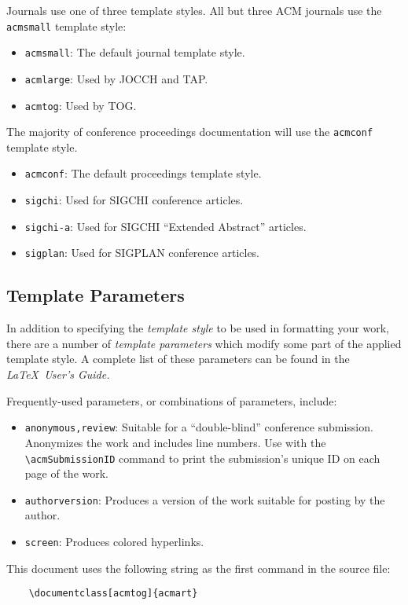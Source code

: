 \documentclass[acmtog]{acmart}
\begin{document}
	Journals use one of three template styles. All but three ACM journals
	use the {\verb|acmsmall|} template style:
	\begin{itemize}
		\item {\verb|acmsmall|}: The default journal template style.
		\item {\verb|acmlarge|}: Used by JOCCH and TAP.
		\item {\verb|acmtog|}: Used by TOG.
	\end{itemize}
	
	The majority of conference proceedings documentation will use the {\verb|acmconf|} template style.
	\begin{itemize}
		\item {\verb|acmconf|}: The default proceedings template style.
		\item{\verb|sigchi|}: Used for SIGCHI conference articles.
		\item{\verb|sigchi-a|}: Used for SIGCHI ``Extended Abstract'' articles.
		\item{\verb|sigplan|}: Used for SIGPLAN conference articles.
	\end{itemize}
	
	\subsection{Template Parameters}
	
	In addition to specifying the {\itshape template style} to be used in
	formatting your work, there are a number of {\itshape template parameters}
	which modify some part of the applied template style. A complete list
	of these parameters can be found in the {\itshape \LaTeX\ User's Guide.}
	
	Frequently-used parameters, or combinations of parameters, include:
	\begin{itemize}
		\item {\verb|anonymous,review|}: Suitable for a ``double-blind''
		conference submission. Anonymizes the work and includes line
		numbers. Use with the \verb|\acmSubmissionID| command to print the
		submission's unique ID on each page of the work.
		\item{\verb|authorversion|}: Produces a version of the work suitable
		for posting by the author.
		\item{\verb|screen|}: Produces colored hyperlinks.
	\end{itemize}
	
	This document uses the following string as the first command in the
	source file:
	\begin{verbatim}
	\documentclass[acmtog]{acmart}
	\end{verbatim}
	
\end{document}
